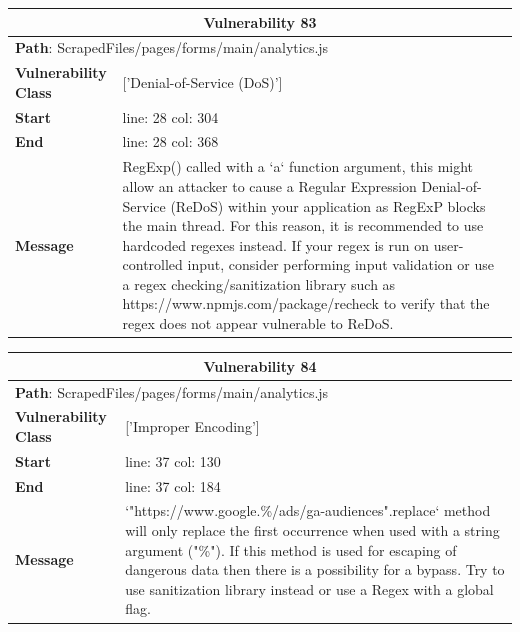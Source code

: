\documentclass[12pt]{article}
\begin{document}
\vspace{0.7cm}
\FloatBarrier
\begin{table}[!h]
\centering
\renewcommand{\arraystretch}{1.3}
\begin{tabular}{|l|p{10cm}|}
\hline
\multicolumn{2}{|c|}{\textbf{Vulnerability 83}} \\
\hline
\multicolumn{2}{|l|}{\textbf{Path}: ScrapedFiles/pages/forms/main/analytics.js} \\
\hline
\textbf{Vulnerability Class} & ['Denial-of-Service (DoS)'] \\
\hline
\textbf{Start} & line: 28 \quad col: 304 \\
\hline
\textbf{End} & line: 28 \quad col: 368 \\
\hline
\textbf{Message} & RegExp() called with a `a` function argument, this might allow an attacker to cause a Regular Expression Denial-of-Service (ReDoS) within your application as RegExP blocks the main thread. For this reason, it is recommended to use hardcoded regexes instead. If your regex is run on user-controlled input, consider performing input validation or use a regex checking/sanitization library such as https://www.npmjs.com/package/recheck to verify that the regex does not appear vulnerable to ReDoS. \\
\hline
\end{tabular}
\end{table}
\vspace{0.7cm}
\FloatBarrier
\begin{table}[!h]
\centering
\renewcommand{\arraystretch}{1.3}
\begin{tabular}{|l|p{10cm}|}
\hline
\multicolumn{2}{|c|}{\textbf{Vulnerability 84}} \\
\hline
\multicolumn{2}{|l|}{\textbf{Path}: ScrapedFiles/pages/forms/main/analytics.js} \\
\hline
\textbf{Vulnerability Class} & ['Improper Encoding'] \\
\hline
\textbf{Start} & line: 37 \quad col: 130 \\
\hline
\textbf{End} & line: 37 \quad col: 184 \\
\hline
\textbf{Message} & `"https://www.google.\%/ads/ga-audiences".replace` method will only replace the first occurrence when used with a string argument ("\%"). If this method is used for escaping of dangerous data then there is a possibility for a bypass. Try to use sanitization library instead or use a Regex with a global flag. \\
\hline
\end{tabular}
\end{table}
\end{document}
